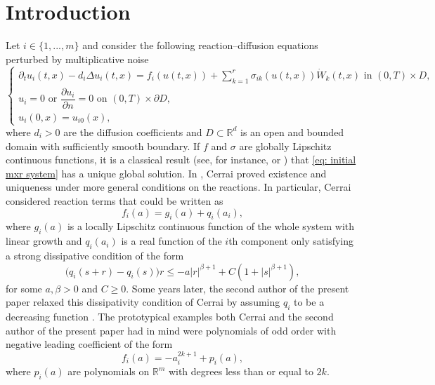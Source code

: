 \documentclass[12pt]{article}
\theoremstyle{definition}
\theoremstyle{remark}
\begin{document}
\section{Introduction}
Let $i\in \{1,...,m\}$ and consider the following reaction--diffusion equations perturbed by multiplicative noise
\begin{equation}\label{eq: initial mxr system}
    \begin{cases}
        \partial_t u_i(t,x) - d_i\Delta u_i(t,x) = f_i(u(t,x))+\sum\limits_{k=1}^r \sigma_{ik}(u(t,x))\dot{W}_k(t,x)\text{ in } (0,T)\times D,\\
        u_i = 0 \text{ or } \dfrac{\partial u_i}{\partial n} = 0 \text{ on } (0,T)\times \partial D,\\
        u_i(0,x) = u_{i0}(x),
    \end{cases}
\end{equation}
where $d_i>0$ are the diffusion coefficients and $D \subset \mathbb R^d$ is an open and bounded domain with sufficiently smooth boundary. If $f$ and $\sigma$ are globally Lipschitz continuous functions, it is a classical result (see, for instance, \cite{da2014stochastic} or \cite{dalang2026stochastic}) that \eqref{eq: initial mxr system} has a unique global solution. In \cite{cerrai2003stochastic}, Cerrai proved existence and uniqueness under more general conditions on the reactions. In particular, Cerrai considered reaction terms that could be written as
\[
f_i(a) = g_i(a) + q_i(a_i),
\]
where $g_i(a)$ is a locally Lipschitz continuous function of the whole system with linear growth and $q_i(a_i)$ is a real function of the $i$th component only satisfying a strong dissipative condition of the form
\[
\bigl(q_i(s+r)-q_i(s)\bigr)r \leq -a|r|^{\beta+1} +C(1+|s|^{\beta+1}),
\]
for some $a,\beta>0$ and $C\geq 0$. Some years later, the second author of the present paper relaxed this dissipativity condition of Cerrai by assuming $q_i$ to be a decreasing function \cite{salins2021systemsLDP}. The prototypical examples both Cerrai and the second author of the present paper had in mind were polynomials of odd order with negative leading coefficient of the form 
\[
f_i(a) = -a_i^{2k+1}+p_i(a),
\]
where $p_i(a)$ are polynomials on $\mathbb R^m$ with degrees less than or equal to $2k$. 
\end{document}
